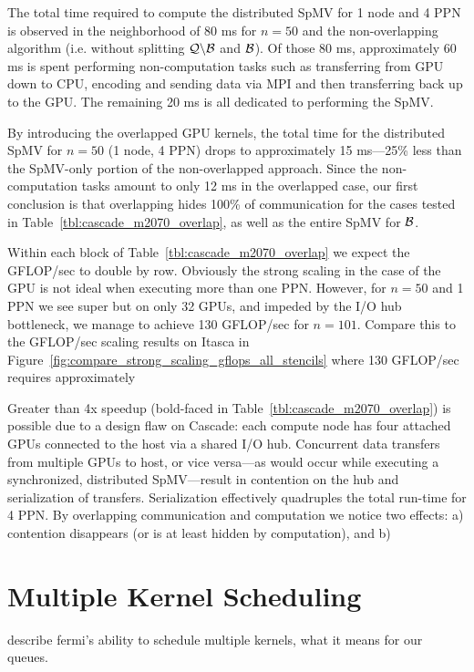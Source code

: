 The total time required to compute the distributed SpMV for 1 node and 4 PPN is observed in the neighborhood of 80 ms for $n=50$ and the non-overlapping algorithm (i.e. without splitting $\mathcal{Q} \backslash \mathcal{B}$ and $\mathcal{B}$). Of those 80 ms, approximately 60 ms is spent performing non-computation tasks such as transferring from GPU down to CPU, encoding and sending data via MPI and then transferring back up to the GPU. The remaining 20 ms is all dedicated to performing the SpMV.

By introducing the overlapped GPU kernels, the total time for the distributed SpMV for $n=50$ (1 node, 4 PPN) drops to approximately 15 ms---25\% less than the SpMV-only portion of the non-overlapped approach. Since the non-computation tasks amount to only 12 ms in the overlapped case, our first conclusion is that overlapping hides 100\% of communication for the cases tested in Table~\ref{tbl:cascade_m2070_overlap}, as well as the entire SpMV for $\mathcal{B}$. 

Within each block of Table~\ref{tbl:cascade_m2070_overlap} we expect the GFLOP/sec to double by row. Obviously the strong scaling in the case of the GPU is not ideal when executing more than one PPN. However, for $n=50$ and 1 PPN we see super but on only 32 GPUs, and impeded by the I/O hub bottleneck, we manage to achieve 130 GFLOP/sec for $n=101$. Compare this to the GFLOP/sec scaling results on Itasca in Figure~\ref{fig:compare_strong_scaling_gflops_all_stencils} where 130 GFLOP/sec requires approximately 


Greater than 4x speedup (bold-faced in Table~\ref{tbl:cascade_m2070_overlap}) is possible due to a design flaw on Cascade: each compute node has four attached GPUs connected to the host via a shared I/O hub. Concurrent data transfers from multiple GPUs to host, or vice versa---as would occur while executing a synchronized, distributed SpMV---result in contention on the hub and serialization of transfers. Serialization effectively quadruples the total run-time for 4 PPN. By overlapping communication and computation we notice two effects: a) contention disappears (or is at least hidden by computation), and b) 


\section{Multiple Kernel Scheduling}
describe fermi's ability to schedule multiple kernels, what it means for our queues. 


